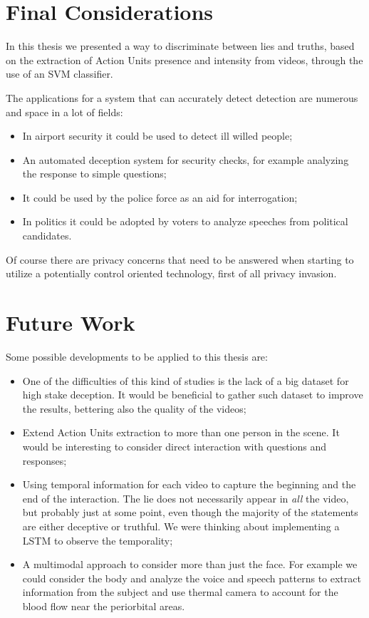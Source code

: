
\section{Final Considerations}
In this thesis we presented a way to discriminate between lies and truths, based on the extraction of Action Units presence and intensity from videos, through the use of an SVM classifier.

The applications for a system that can accurately detect detection are numerous and space in a lot of fields:
\begin{itemize}
	\item In airport security it could be used to detect ill willed people;
	\item An automated deception system for security checks, for example analyzing the response to simple questions;
	\item It could be used by the police force as an aid for interrogation;
	\item In politics it could be adopted by voters to analyze speeches from political candidates.
\end{itemize}
Of course there are privacy concerns that need to be answered when starting to utilize a potentially control oriented technology, first of all privacy invasion.

\section{Future Work} \label{fw}
Some possible developments to be applied to this thesis are:
\begin{itemize}
	\item One of the difficulties of this kind of studies is the lack of a big dataset for high stake deception. It would be beneficial to gather such dataset to improve the results, bettering also the quality of the videos;
	\item Extend Action Units extraction to more than one person in the scene. It would be interesting to consider direct interaction with questions and responses;
	\item Using temporal information for each video to capture the beginning and the end of the interaction. The lie does not necessarily appear in \textit{all} the video, but probably just at some point, even though the majority of the statements are either deceptive or truthful. We were thinking about implementing a LSTM to observe the temporality;
	\item A multimodal approach to consider more than just the face. For example we could consider the body and analyze the voice and speech patterns to extract information from the subject and use thermal camera to account for the blood flow near the periorbital areas.
\end{itemize}